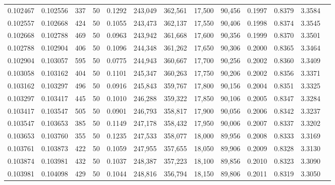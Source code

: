 \begin{tabular}{rrrrrrrrrrrrr}
0.102467 & 0.102556 &   337 &  50 &                                     0.1292 & 243,049 & 362,561 &  17,500 &  90,456 & 0.1997 & 0.8379 & 3.3584 \\
0.102557 & 0.102668 &   424 &  50 &                                     0.1055 & 243,473 & 362,137 &  17,550 &  90,406 & 0.1998 & 0.8374 & 3.3545 \\
0.102668 & 0.102788 &   469 &  50 &                                     0.0963 & 243,942 & 361,668 &  17,600 &  90,356 & 0.1999 & 0.8370 & 3.3501 \\
0.102788 & 0.102904 &   406 &  50 &                                     0.1096 & 244,348 & 361,262 &  17,650 &  90,306 & 0.2000 & 0.8365 & 3.3464 \\
0.102904 & 0.103057 &   595 &  50 &                                     0.0775 & 244,943 & 360,667 &  17,700 &  90,256 & 0.2002 & 0.8360 & 3.3409 \\
0.103058 & 0.103162 &   404 &  50 &                                     0.1101 & 245,347 & 360,263 &  17,750 &  90,206 & 0.2002 & 0.8356 & 3.3371 \\
0.103162 & 0.103297 &   496 &  50 &                                     0.0916 & 245,843 & 359,767 &  17,800 &  90,156 & 0.2004 & 0.8351 & 3.3325 \\
0.103297 & 0.103417 &   445 &  50 &                                     0.1010 & 246,288 & 359,322 &  17,850 &  90,106 & 0.2005 & 0.8347 & 3.3284 \\
0.103417 & 0.103547 &   505 &  50 &                                     0.0901 & 246,793 & 358,817 &  17,900 &  90,056 & 0.2006 & 0.8342 & 3.3237 \\
0.103547 & 0.103653 &   385 &  50 &                                     0.1149 & 247,178 & 358,432 &  17,950 &  90,006 & 0.2007 & 0.8337 & 3.3202 \\
0.103653 & 0.103760 &   355 &  50 &                                     0.1235 & 247,533 & 358,077 &  18,000 &  89,956 & 0.2008 & 0.8333 & 3.3169 \\
0.103761 & 0.103873 &   422 &  50 &                                     0.1059 & 247,955 & 357,655 &  18,050 &  89,906 & 0.2009 & 0.8328 & 3.3130 \\
0.103874 & 0.103981 &   432 &  50 &                                     0.1037 & 248,387 & 357,223 &  18,100 &  89,856 & 0.2010 & 0.8323 & 3.3090 \\
0.103981 & 0.104098 &   429 &  50 &                                     0.1044 & 248,816 & 356,794 &  18,150 &  89,806 & 0.2011 & 0.8319 & 3.3050 \\

\end{tabular}
